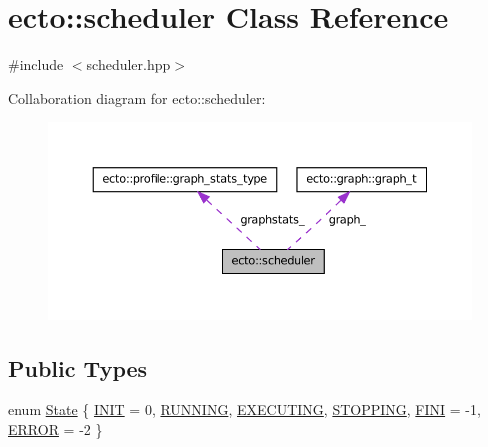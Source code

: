 \hypertarget{classecto_1_1scheduler}{\section{ecto\-:\-:scheduler \-Class \-Reference}
\label{classecto_1_1scheduler}
}


{\ttfamily \#include $<$scheduler.\-hpp$>$}



\-Collaboration diagram for ecto\-:\-:scheduler\-:\nopagebreak
\begin{figure}[H]
\begin{center}
\leavevmode
\includegraphics[width=350pt]{classecto_1_1scheduler__coll__graph}
\end{center}
\end{figure}
\subsection*{\-Public \-Types}
\begin{DoxyCompactItemize}
\item 
enum \hyperlink{classecto_1_1scheduler_a6b063d1c4bb9dad58d7ace61946b1200}{\-State} \{ \*
\hyperlink{classecto_1_1scheduler_a6b063d1c4bb9dad58d7ace61946b1200a347092c6b9c4bbc7084bfa04d9ffb57f}{\-I\-N\-I\-T} =  0, 
\hyperlink{classecto_1_1scheduler_a6b063d1c4bb9dad58d7ace61946b1200aef190614c39d85b915b9ff2225eacf02}{\-R\-U\-N\-N\-I\-N\-G}, 
\hyperlink{classecto_1_1scheduler_a6b063d1c4bb9dad58d7ace61946b1200a3e140c949a41686e2e0481d13e89c010}{\-E\-X\-E\-C\-U\-T\-I\-N\-G}, 
\hyperlink{classecto_1_1scheduler_a6b063d1c4bb9dad58d7ace61946b1200a0cf2ac365020f8cd0a6860a3983a0dad}{\-S\-T\-O\-P\-P\-I\-N\-G}, 
\*
\hyperlink{classecto_1_1scheduler_a6b063d1c4bb9dad58d7ace61946b1200aa9b97654759582b6e92fbc17a31623bd}{\-F\-I\-N\-I} =  -\/1, 
\hyperlink{classecto_1_1scheduler_a6b063d1c4bb9dad58d7ace61946b1200a45aebc05bdc20659645ad6e1729db520}{\-E\-R\-R\-O\-R} =  -\/2
 \}
\end{DoxyCompactItemize}
